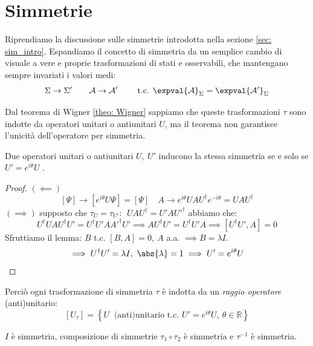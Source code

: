 \chapter{Simmetrie}

Riprendiamo la discussione sulle simmetrie introdotta nella sezione \ref{sec: sim_intro}. 
Espandiamo il concetto di simmetria da un semplice cambio di visuale a vere e proprie trasformazioni di stati e osservabili, che mantengano sempre invariati i valori medi:
\begin{equation}
    \Sigma\to \Sigma' \qquad \mathcal{A}\to \mathcal{A}' \qquad  \text{ t.c. } \expval{\mathcal{A}}_\Sigma  = \expval{\mathcal{A}'}_\Sigma
\end{equation}

Dal teorema di Wigner \ref{theo: Wigner} sappiamo che queste trasformazioni \(\tau\) sono indotte da operatori unitari o antiunitari \(U\), ma il teorema non garantisce l'unicità dell'operatore per simmetria.

\begin{theorem}
    Due operatori unitari o antiunitari \(U, \ U'\) inducono la stessa simmetria se e solo se \(U ' = e^{i\theta}U\) .
\end{theorem}
\begin{proof}
    \((\impliedby) \) 
    \[
        \left[ \Psi \right]\to \left[ e^{i\theta}U \Psi\right]= \left[ \Psi \right] \quad A \to e^{i\theta}UAU^\dagger e ^{-i\theta}= UAU^\dagger
    \]
    \((\implies) \) supposto che \(\tau_U = \tau_{U'}: \ \ UAU^\dagger = U'AU'^\dagger\) abbiamo che:
    \[
       U^\dagger U A U^\dagger U'= U^\dagger U'A A'^\dagger U'  \implies AU^\dagger U'= U^\dagger U ' A
       \implies \left[ U^\dagger U', A \right]=0
    \] 
    Sfruttiamo il lemma: \(B\) t.c. \(\left[ B,A \right]= 0 , \ A \) a.a. \(\implies B = \lambda I\).
    \[
        \implies U^\dagger U' = \lambda I , \ \abs{\lambda} = 1 \implies U ' = e^{i\theta}U
    \]
\end{proof}
Perciò ogni trasformazione di simmetria \(\tau\) è indotta da un \textit{raggio operatore} (anti)unitario:
\begin{equation}
    \left[ U_\tau \right]= \left\{ U \ \text{ (anti)unitario t.c. } U' = e^{i\theta}U , \ \theta \in \mathbb{R}\right\}
\end{equation}

\begin{remark}
    \(I\) è simmetria, composizione di simmetrie \(\tau_1 \circ \tau_2\) è simmetria e \(\tau^{-1}\) è simmetria.
\end{remark}


